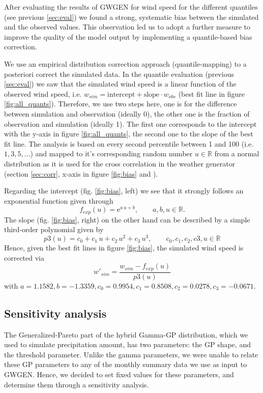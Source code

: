 \begin{refsection}
After evaluating the results of GWGEN for wind speed for the different quantiles (see previous \autoref{sec:eval}) we found a strong, systematic bias between the simulated and the observed values. This observation led us to adopt a further measure to improve the quality of the model output by implementing a quantile-based bias correction.

We use an empirical distribution correction approach (quantile-mapping) \citep{LafonDadsonBuysEtAl2012} to a posteriori correct the simulated data. In the quantile evaluation (previous \autoref{sec:eval}) we saw that the simulated wind speed is a linear function of the observed wind speed, i.e. $w_{sim} = \text{intercept} + \text{slope} \cdot w_{obs}$ (best fit line in figure \ref{fig:all_quants}). Therefore, we use two steps here, one is for the difference between simulation and observation (ideally 0), the other one is the fraction of observation and simulation (ideally 1). The first one corresponds to the intercept with the y-axis in figure \ref{fig:all_quants}, the second one to the slope of the best fit line. The analysis is based on every second percentile between 1 and 100 (i.e. $1, 3, 5, \ldots$) and mapped to it's corresponding random number $u\in\mathbb{R}$ from a normal distribution as it is used for the cross correlation in the weather generator (section \ref{sec:corr}, x-axis in figure \ref{fig:bias} and \cite{Richardson1981}). 

Regarding the intercept (fig. \ref{fig:bias}, left) we see that it strongly follows an exponential function given through
\begin{equation}
f_{exp}(u) = \mathrm{e}^{a\, u + b}, \qquad a, b, u \in \mathbb{R} \label{eq:wind_intercept}.
\end{equation}
The slope (fig. \ref{fig:bias}, right) on the other hand can be described by a simple third-order polynomial given by
\begin{equation}
p3(u) = c_0 + c_1\, u + c_2\, u^2 + c_3\, u^3, \qquad c_0, c_1, c_2, c3, u \in\mathbb{R} \label{eq:wind_slope}
\end{equation}
Hence, given the best fit lines in figure \ref{fig:bias}, the simulated wind speed is corrected via
\begin{equation}
w'_{sim} = \frac{w_{sim} - f_{exp}(u)}{p3(u)} \label{eq:bias-wind}
\end{equation}
with $a =1.1582, b = -1.3359, c_0 = 0.9954, c_1 = 0.8508, c_2 = 0.0278, c_3 = -0.0671$.


\subsection{Sensitivity analysis} \label{sec:sens}
The Generalized-Pareto part of the hybrid Gamma-GP distribution, which we used to simulate precipitation amount, has two parameters: the GP shape, and the threshold parameter. Unlike the gamma parameters, we were unable to relate these GP parameters to any of the monthly summary data we use as input to GWGEN. Hence, we decided to set fixed values for these parameters, and determine them through a sensitivity analysis.


\end{refsection}
